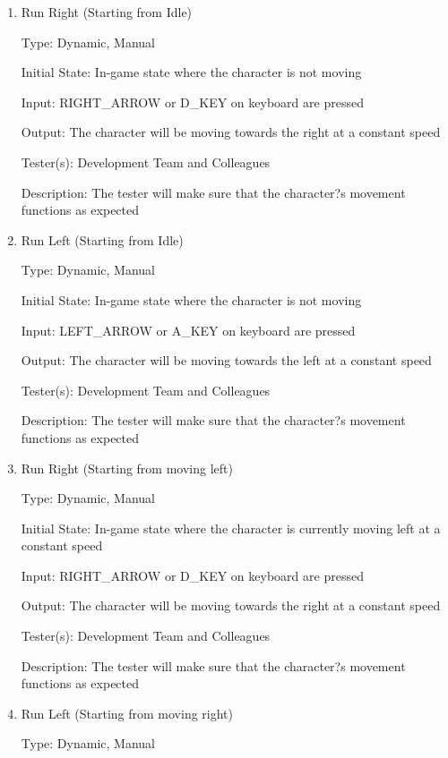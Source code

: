 \documentclass[12pt, titlepage]{article}
\begin{document}
\begin{enumerate}

\item{Run Right (Starting from Idle)\\}

Type: Dynamic, Manual

Initial State: In-game state where the character is not moving

Input: RIGHT\_ARROW or D\_KEY on keyboard are pressed 

Output: The character will be moving towards the right at a constant speed

Tester(s): Development Team and Colleagues

Description: The tester will make sure that the character?s movement functions as expected

\item{Run Left (Starting from Idle)\\}

Type: Dynamic, Manual

Initial State: In-game state where the character is not moving

Input: LEFT\_ARROW or A\_KEY on keyboard are pressed

Output: The character will be moving towards the left at a constant speed

Tester(s): Development Team and Colleagues

Description: The tester will make sure that the character?s movement functions as expected

\item{Run Right (Starting from moving left)\\}

Type: Dynamic, Manual

Initial State: In-game state where the character is currently moving left at a constant speed

Input: RIGHT\_ARROW or D\_KEY on keyboard are pressed

Output: The character will be moving towards the right at a constant speed

Tester(s): Development Team and Colleagues

Description: The tester will make sure that the character?s movement functions as expected

\item{Run Left (Starting from moving right)\\}

Type: Dynamic, Manual


\end{enumerate}
\end{document}
